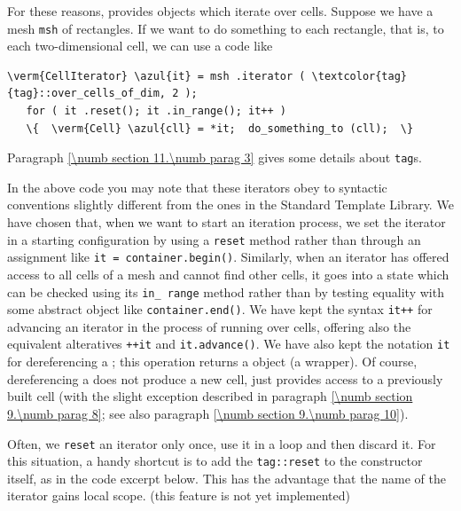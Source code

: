 For these reasons, {\maniFEM} provides objects which iterate over cells.
Suppose we have a mesh {\small\tt msh} of rectangles.
If we want to do something to each rectangle, that is, to each two-dimensional cell,
we can use a code like

\begin{Verbatim}[commandchars=\\\{\},formatcom=\small\tt,
   baselinestretch=0.94,framesep=2mm                      ]
   \verm{CellIterator} \azul{it} = msh .iterator ( \textcolor{tag}{tag}::over_cells_of_dim, 2 );
   for ( it .reset(); it .in_range(); it++ )
   \{  \verm{Cell} \azul{cll} = *it;  do_something_to (cll);  \}
\end{Verbatim}

Paragraph \ref{\numb section 11.\numb parag 3} gives some details about {\small\tt\textcolor{tag}{tag}}s.

In the above code you may note that these iterators obey to syntactic conventions
slightly different from the ones in the Standard Template Library.
We have chosen that, when we want to start an iteration process, we set the iterator in
a starting configuration by using a {\small\tt reset} method rather than through an assignment
like {\small\tt it = container.begin()}.
Similarly, when an iterator has offered access to all cells of a mesh and cannot find
other cells, it goes into a state which can be checked using its {\small\tt in\_\,range} method
rather than by testing equality with some abstract object like {\small\tt container.end()}.
We have kept the syntax {\small\tt it++} for advancing an iterator in the process of
running over cells, offering also the equivalent alteratives {\small\tt ++it} and
{\small\tt it.advance()}.
We have also kept the notation {\small\tt *it} for dereferencing a
{\small\tt {}};
this operation returns a {\small\tt {}} object (a wrapper).
Of course, dereferencing a {\small\tt {}} does not produce a new cell,
just provides access to a previously built cell
(with the slight exception described in paragraph \ref{\numb section 9.\numb parag 8};
see also paragraph \ref{\numb section 9.\numb parag 10}).

Often, we {\small\tt reset} an iterator only once, use it in a loop and then discard it.
For this situation, a handy shortcut is to add the {\small\tt\textcolor{tag}{tag}::reset}
to the constructor itself, as in the code excerpt below.
This has the advantage that the name of the iterator gains local scope.
(this feature is not yet implemented)


